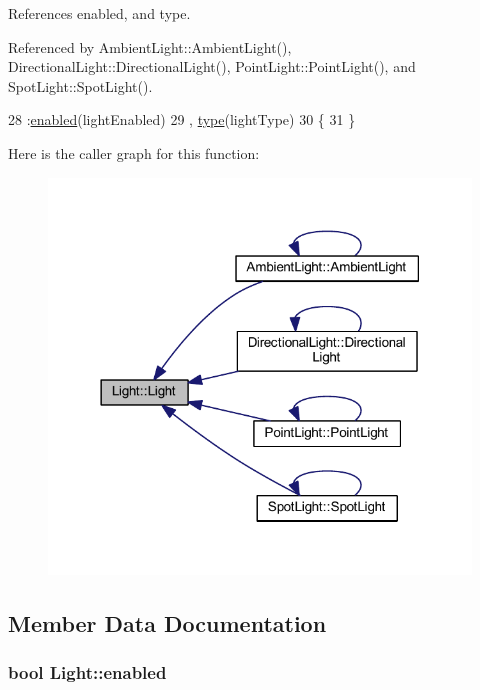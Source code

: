 References enabled, and type.



Referenced by Ambient\+Light\+::\+Ambient\+Light(), Directional\+Light\+::\+Directional\+Light(), Point\+Light\+::\+Point\+Light(), and Spot\+Light\+::\+Spot\+Light().


\begin{DoxyCode}
28     :\hyperlink{struct_light_a6dfed8051e33dde2baaef3e50d74084e}{enabled}(lightEnabled)
29     , \hyperlink{struct_light_a86e648b4a80a5c1e194c97ef52f9efc6}{type}(lightType)
30   \{
31   \}
\end{DoxyCode}


Here is the caller graph for this function\+:\nopagebreak
\begin{figure}[H]
\begin{center}
\leavevmode
\includegraphics[width=318pt]{struct_light_a0df5e58af351bd13c996da2880be0dee_icgraph}
\end{center}
\end{figure}




\subsection{Member Data Documentation}
\subsubsection[{\texorpdfstring{enabled}{enabled}}]{\setlength{\rightskip}{0pt plus 5cm}bool Light\+::enabled}\hypertarget{struct_light_a6dfed8051e33dde2baaef3e50d74084e}{}\label{struct_light_a6dfed8051e33dde2baaef3e50d74084e}


